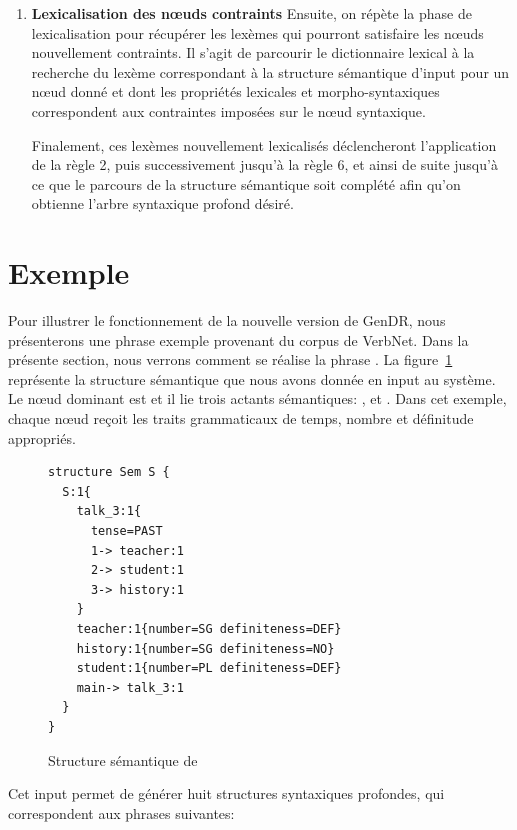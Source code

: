 \begin{enumerate}
	\item \textbf{Lexicalisation des n\oe{}uds contraints}
Ensuite, on répète la phase de lexicalisation pour récupérer les lexèmes qui pourront satisfaire les n\oe{}uds nouvellement contraints. Il s'agit de parcourir le dictionnaire lexical à la recherche du lexème correspondant à la structure sémantique d'input pour un n\oe{}ud donné et dont les propriétés lexicales et morpho-syntaxiques correspondent aux contraintes imposées sur le n\oe{}ud syntaxique.

Finalement, ces lexèmes nouvellement lexicalisés déclencheront l'application de la règle 2, puis successivement jusqu'à la règle 6, et ainsi de suite jusqu'à ce que le parcours de la structure sémantique soit complété afin qu'on obtienne l'arbre syntaxique profond désiré.

\end{enumerate} 

\section{Exemple}

Pour illustrer le fonctionnement de la nouvelle version de GenDR, nous présenterons une phrase exemple provenant du corpus de VerbNet. Dans la présente section, nous verrons comment se réalise la phrase . La figure~\ref{fig:history} représente la structure sémantique que nous avons donnée en input au système. Le n\oe{}ud dominant est  et il lie trois actants sémantiques: ,  et . Dans cet exemple, chaque n\oe{}ud reçoit les traits grammaticaux de temps, nombre et définitude appropriés.

\begin{figure}[htb]
\begin{lstlisting}[language=mate]
structure Sem S {
  S:1{
    talk_3:1{
      tense=PAST 
      1-> teacher:1
      2-> student:1
	  3-> history:1
    }
    teacher:1{number=SG definiteness=DEF}
    history:1{number=SG definiteness=NO}
    student:1{number=PL definiteness=DEF}
    main-> talk_3:1
  }
}
\end{lstlisting}
  \caption{Structure sémantique de }
	\label{fig:history}
\end{figure}

Cet input permet de générer huit structures syntaxiques profondes, qui correspondent aux phrases suivantes:

